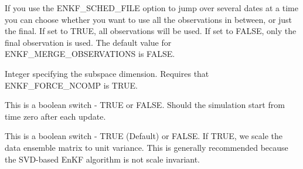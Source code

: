 \documentclass[a4paper,10pt,english]{sphinxmanual}
\begin{document}
\label{\detokenize{keywords/index:enkf-merge-observations}}
\begin{sphinxShadowBox}

If you use the ENKF\_SCHED\_FILE option to jump over several dates at a time you
can choose whether you want to use all the observations in between, or just
the final. If set to TRUE, all observations will be used. If set to FALSE,
only the final observation is used. The default value for
ENKF\_MERGE\_OBSERVATIONS is FALSE.


%
\begin{sphinxVerbatim}[commandchars=\\\{\}]
  
 
\end{sphinxVerbatim}
\end{sphinxShadowBox}
\label{\detokenize{keywords/index:enkf-ncomp}}
\begin{sphinxShadowBox}

Integer specifying the subspace dimension. Requires that ENKF\_FORCE\_NCOMP is
TRUE.
\end{sphinxShadowBox}
\label{\detokenize{keywords/index:enkf-rerun}}
\begin{sphinxShadowBox}

This is a boolean switch - TRUE or FALSE. Should the simulation start from
time zero after each update.
\end{sphinxShadowBox}
\label{\detokenize{keywords/index:enkf-scaling}}
\begin{sphinxShadowBox}

This is a boolean switch - TRUE (Default) or FALSE. If TRUE, we scale the data
ensemble matrix to unit variance. This is generally recommended because the
SVD-based EnKF algorithm is not scale invariant.
\end{sphinxShadowBox}
\label{\detokenize{keywords/index:enkf-truncation}}
\end{document}

